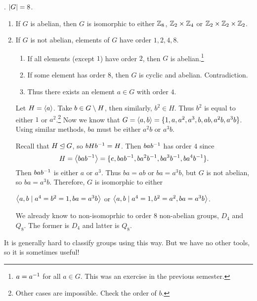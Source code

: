 \ex. \(\left| G \right| = 8\).
\begin{enumerate}
    \item If \(G\) is abelian, then \(G\) is isomorphic to either \(\mathbb{Z}_8\), \(\mathbb{Z}_2 \times \mathbb{Z}_4\) or \(\mathbb{Z}_2 \times \mathbb{Z}_2 \times \mathbb{Z}_2\).
    \item If \(G\) is not abelian, elements of \(G\) have order \(1, 2, 4, 8\).
          \begin{enumerate}
              \item If all elements (except \(1\)) have order \(2\), then \(G\) is abelian.\footnote{\(a = a^{-1}\) for all \(a \in G\). This was an exercise in the previous semester.}
              \item If some element has order \(8\), then \(G\) is cyclic and abelian. Contradiction.
              \item Thus there exists an element \(a \in G\) with order \(4\).
          \end{enumerate}
          Let \(H = \left\langle a \right\rangle\). Take \(b \in G \setminus H\), then similarly, \(b^2 \in H\). Thus \(b^2 \) is equal to either \(1\) or \(a^2\).\footnote{Other cases are impossible. Check the order of \(b\).} Now we know that \(G = \left\langle a, b \right\rangle = \{1, a, a^2, a^3, b, ab, a^2b, a^3b\}\). Using similar methods, \(ba\) must be either \(a^2b\) or \(a^3b\).

          Recall that \(H \unlhd G\), so \(bHb^{-1} = H\). Then \(bab^{-1}\) has order \(4\) since
          \[
              H = \left\langle bab^{-1} \right\rangle = \{e, bab^{-1}, ba^2b^{-1}, ba^3b^{-1}, ba^4b^{-1}\}.
          \]
          Then \(bab^{-1}\) is either \(a\) or \(a^3\). Thus \(ba = ab\) or \(ba = a^3b\), but \(G\) is not abelian, so \(ba = a^3b\). Therefore, \(G\) is isomorphic to either
          \begin{center}
              \(\left\langle a, b \mid a^4 = b^2 = 1, ba = a^3b \right\rangle\) \quad or \quad \(\left\langle a, b \mid a^4 = 1, b^2 = a^2, ba = a^3b \right\rangle\).
          \end{center}
          We already know to non-isomoprhic to order \(8\) non-abelian groups, \(D_4\) and \(Q_8\). The former is \(D_4\) and latter is \(Q_8\).
\end{enumerate}

It is generally hard to classify groups using this way. But we have no other tools, so it is sometimes useful!

\pagebreak
